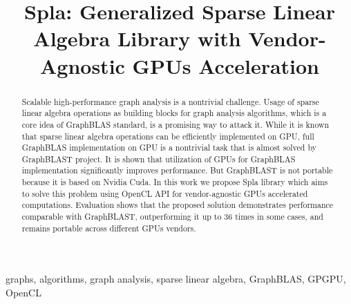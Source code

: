 \documentclass[conference]{IEEEtran}
\begin{document}
\title{Spla: Generalized Sparse Linear Algebra Library with Vendor-Agnostic GPUs Acceleration}

\author{
\and
{}
}

\maketitle

\begin{abstract}
    Scalable high-performance graph analysis is a nontrivial challenge. 
    Usage of sparse linear algebra operations as building blocks for graph analysis algorithms, which is a core idea of GraphBLAS standard, is a promising way to attack it.
    While it is known that sparse linear algebra operations can be efficiently implemented on GPU, full GraphBLAS implementation on GPU is a nontrivial task that is almost solved by GraphBLAST project. 
    It is shown that utilization of GPUs for GraphBLAS implementation significantly improves performance. But GraphBLAST is not portable because it is based on Nvidia Cuda.
    In this work we propose Spla library which aims to solve this problem using OpenCL API for vendor-agnostic GPUs accelerated computations.
    Evaluation shows that the proposed solution demonstrates performance comparable with GraphBLAST, outperforming it up to 36 times in some cases, and remains portable across different GPUs vendors.
\end{abstract}

\begin{IEEEkeywords}
graphs, algorithms, graph analysis, sparse linear algebra, GraphBLAS, GPGPU, OpenCL
\end{IEEEkeywords}








\end{document}
